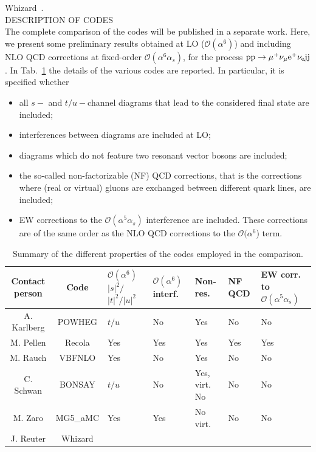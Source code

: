 {\sc Whizard}~\cite{Moretti:2001zz,Kilian:2007gr}.\\
DESCRIPTION OF CODES\\
The complete comparison of the codes will be published in a separate work. Here, we present some preliminary results obtained at LO ($\mathcal O (\alpha^6)$) and including
NLO QCD corrections at fixed-order $\mathcal O (\alpha^6\alpha_s)$, for the process ${\rm p}{\rm p}\to\mu^+\nu_\mu{\rm e}^+\nu_{\rm e}{\rm j}{\rm j}$.
In Tab.~\ref{tab:wg1_codes} the details of the various codes are reported. In particular, it is specified whether
\begin{itemize}
    \item all $s-$ and $t/u-$channel diagrams that lead to the considered final state are included;
    \item interferences between diagrams are included at LO;
    \item diagrams which do not feature two resonant vector bosons are included;
    \item the so-called non-factorizable (NF) QCD corrections, that is the corrections where (real or virtual) gluons are exchanged between different quark lines,
        are included;
    \item EW corrections to the $\mathcal O (\alpha^5\alpha_s)$ interference are included. These corrections are of the same order as the NLO QCD corrections to
        the  $\mathcal O (\alpha^6$) term.
\end{itemize}
%
\begin{table}
    \footnotesize
    \begin{tabularx}{\textwidth}{c|c|X|X|X|X|X}
        Contact person  &  Code  &  $\mathcal O(\alpha^6)$ $|s|^2/$ $|t|^2/|u|^2$  &  $\mathcal O(\alpha^6)$ interf.  &  Non-res.  &  NF QCD  &  EW corr. to $\mathcal O(\alpha^5\alpha_s)$  \\
        \hline
        \hline
        A. Karlberg  &  {\sc POWHEG}  &  $t/u$  &  No  &  Yes  &  No  &  No  \\
        M. Pellen    &  {\sc Recola}  &  Yes  &  Yes  &  Yes  &  Yes  &  Yes  \\
        M. Rauch     &  {\sc VBFNLO}  &  Yes  &  No  &  Yes  &  No  &  No  \\
        C. Schwan    &  {\sc BONSAY}  &  $t/u$  &  No  &  Yes, virt. No  &  No  &  No  \\
        M. Zaro      &  {\sc MG5\_aMC}  &  Yes  &  Yes  &  No virt.  &  No  &  No \\
        J. Reuter    &  {\sc Whizard}  &    &    &    &    &  
    \end{tabularx}
    \caption{\label{tab:wg1_codes} Summary of the different properties of the codes employed in the comparison.}
\end{table}
%

